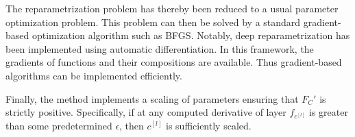 The reparametrization problem has thereby been reduced to a usual parameter optimization problem. This problem can then be solved by a standard gradient-based optimization algorithm such as BFGS. Notably, deep reparametrization has been implemented using automatic differentiation. In this framework, the gradients of functions and their compositions are available. Thus gradient-based algorithms can be implemented efficiently.

Finally, the method implements a scaling of parameters ensuring that \(F_C' \) is strictly positive. Specifically, if at any computed derivative of layer  \(f_{c^{[l]}}\) is greater than some predetermined \(\epsilon\), then \(c^{[l]}\) is sufficiently scaled.